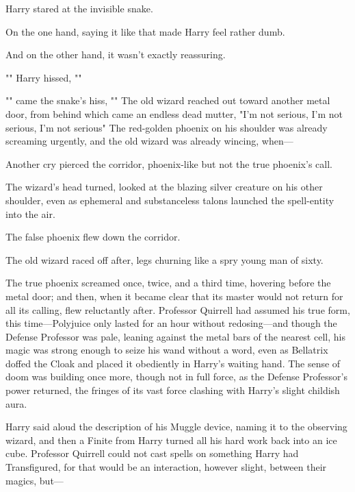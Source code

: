 Harry stared at the invisible snake.

On the one hand, saying it like that made Harry feel rather dumb.

And on the other hand, it wasn't exactly reassuring.

"" Harry hissed, ""

"" came the snake's hiss, ""
\sbreak
The old wizard reached out toward another metal door, from behind which came an
endless dead mutter, "I'm not serious, I'm not serious, I'm not
serious{\el}" The red-golden phoenix on his shoulder was already screaming
urgently, and the old wizard was already wincing, when---

Another cry pierced the corridor, phoenix-like but not the true phoenix's call.

The wizard's head turned, looked at the blazing silver creature on his other
shoulder, even as ephemeral and substanceless talons launched the spell-entity
into the air.

The false phoenix flew down the corridor.

The old wizard raced off after, legs churning like a spry young man of sixty.

The true phoenix screamed once, twice, and a third time, hovering before the
metal door; and then, when it became clear that its master would not return for
all its calling, flew reluctantly after.
\sbreak
Professor Quirrell had assumed his true form, this time---Polyjuice only lasted
for an hour without redosing---and though the Defense Professor was pale,
leaning against the metal bars of the nearest cell, his magic was strong enough
to seize his wand without a word, even as Bellatrix doffed the Cloak and placed
it obediently in Harry's waiting hand. The sense of doom was building once
more, though not in full force, as the Defense Professor's power returned, the
fringes of its vast force clashing with Harry's slight childish aura.

Harry said aloud the description of his Muggle device, naming it to the
observing wizard, and then a Finite from Harry turned all his hard work back
into an ice cube. Professor Quirrell could not cast spells on something Harry
had Transfigured, for that would be an interaction, however slight, between
their magics, but---

